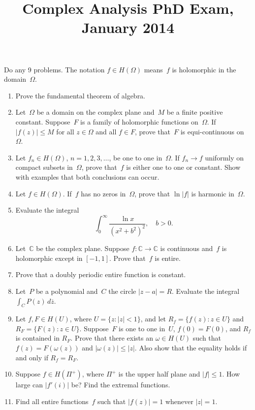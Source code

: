 \documentclass[11pt,letterpaper]{article}
\title{Complex Analysis PhD Exam, January 2014}
\author{}
\date{}
\newenvironment{examproblems}[2]{%
  \def\ProblemHeadingTag{#2}%
  \AssignTaggingSocketPlug{block/list/label}{examproblem}%
  \begin{enumerate}%
  \setcounter{enumi}{#1}%
  \renewcommand{\labelenumi}{\textbf{\theenumi.}}%
  \setlength{\topsep}{0.35em}%
  \setlength{\partopsep}{0pt}%
  \setlength{\itemsep}{0.48em}%
  \setlength{\parsep}{0.18em}%
}{\end{enumerate}}
\newenvironment{examinstructions}{%
  \par\begingroup\itshape
}{%
  \par\endgroup\vspace{0.18em}
}
\begin{document}
\maketitle
\thispagestyle{empty}
\begin{examinstructions}
Do any 9 problems. The notation \(f \in H(\Omega)\) means~\(f\) is holomorphic in the domain~\(\Omega\).
\end{examinstructions}
\begin{examproblems}{0}{H2}
\def\ProblemHeadingText{Problem 1.}
\item
Prove the fundamental theorem of algebra.
\def\ProblemHeadingText{Problem 2.}
\item
Let~\(\Omega\) be a domain on the complex plane and~\(M\) be a finite positive constant. Suppose~\(F\) is a family of holomorphic functions on~\(\Omega\). If \(|f(z)| \leq M\) for all \(z \in \Omega\) and all \(f \in F\), prove that~\(F\) is equi-continuous on~\(\Omega\).
\def\ProblemHeadingText{Problem 3.}
\item
Let \(f_n \in H(\Omega)\), \(n=1,2,3,\ldots\), be one to one in~\(\Omega\). If \(f_n \to f\) uniformly on compact subsets in~\(\Omega\), prove that~\(f\) is either one to one or constant. Show with examples that both conclusions can occur.
\def\ProblemHeadingText{Problem 4.}
\item
Let \(f \in H(\Omega)\). If~\(f\) has no zeros in~\(\Omega\), prove that \(\ln |f|\) is harmonic in~\(\Omega\).
\def\ProblemHeadingText{Problem 5.}
\item
Evaluate the integral
\[
\int_0^\infty \frac{\ln x}{(x^2+b^2)^2}, \quad b>0.
\]
\def\ProblemHeadingText{Problem 6.}
\item
Let~\(\mathbb{C}\) be the complex plane. Suppose \(f:\mathbb{C}\to\mathbb{C}\) is continuous and~\(f\) is holomorphic except in \([-1,1]\). Prove that~\(f\) is entire.
\def\ProblemHeadingText{Problem 7.}
\item
Prove that a doubly periodic entire function is constant.
\def\ProblemHeadingText{Problem 8.}
\item
Let~\(P\) be a polynomial and~\(C\) the circle \(|z-a|=R\). Evaluate the integral \(\int_C P(z)\,d\overline{z}\).
\def\ProblemHeadingText{Problem 9.}
\item
Let \(f,F \in H(U)\), where \(U=\{z:|z|<1\}\), and let \(R_f=\{f(z):z\in U\}\) and \(R_F=\{F(z):z\in U\}\). Suppose~\(F\) is one to one in~\(U\), \(f(0)=F(0)\), and \(R_f\) is contained in \(R_F\). Prove that there exists an \(\omega \in H(U)\) such that \(f(z)=F(\omega(z))\) and \(|\omega(z)|\leq |z|\). Also show that the equality holds if and only if \(R_f=R_F\).
\def\ProblemHeadingText{Problem 10.}
\item
Suppose \(f \in H(\Pi^+)\), where \(\Pi^+\) is the upper half plane and \(|f|\leq 1\). How large can \(|f'(i)|\) be? Find the extremal functions.
\def\ProblemHeadingText{Problem 11.}
\item
Find all entire functions~\(f\) such that \(|f(z)|=1\) whenever \(|z|=1\).
\end{examproblems}
\end{document}
